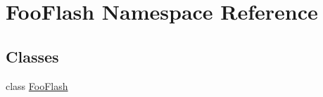 \hypertarget{namespace_foo_flash}{\section{Foo\-Flash Namespace Reference}
\label{namespace_foo_flash}
}
\subsection*{Classes}
\begin{DoxyCompactItemize}
\item 
class \hyperlink{class_foo_flash_1_1_foo_flash}{Foo\-Flash}
\end{DoxyCompactItemize}
